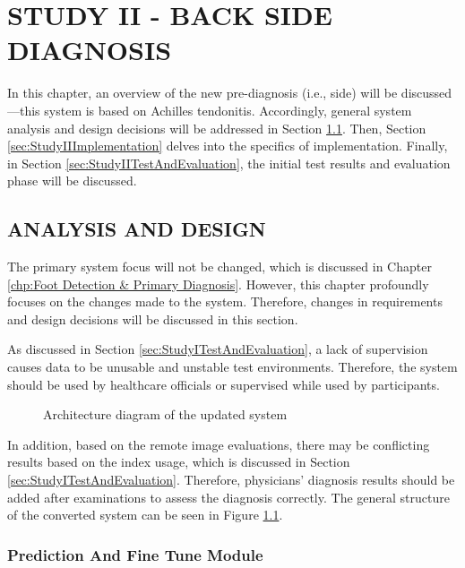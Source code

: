 \chapter{STUDY II - BACK SIDE DIAGNOSIS}\label{chp:Back Side Diagnosis}

In this chapter, an overview of the new pre-diagnosis (i.e., side) will be discussed—this system is based on Achilles tendonitis. Accordingly, general system analysis and design decisions will be addressed in Section \ref{sec:StudyIIAnalysisAndDesign}. Then, Section \ref{sec:StudyIIImplementation} delves into the specifics of implementation. Finally, in Section \ref{sec:StudyIITestAndEvaluation}, the initial test results and evaluation phase will be discussed.

\section{ANALYSIS AND DESIGN} \label{sec:StudyIIAnalysisAndDesign}

The primary system focus will not be changed, which is discussed in Chapter \ref{chp:Foot Detection & Primary Diagnosis}. However, this chapter profoundly focuses on the changes made to the system. Therefore, changes in requirements and design decisions will be discussed in this section.

As discussed in Section \ref{sec:StudyITestAndEvaluation}, a lack of supervision causes data to be unusable and unstable test environments. Therefore, the system should be used by healthcare officials or supervised while used by participants.

\begin{figure}[htbp]
\centering
{}
\caption{Architecture diagram of the updated system}
\label{fig:GeneralArchitectureDiagramPartI}
\end{figure}

In addition, based on the remote image evaluations, there may be conflicting results based on the index usage, which is discussed in Section \ref{sec:StudyITestAndEvaluation}. Therefore, physicians' diagnosis results should be added after examinations to assess the diagnosis correctly. The general structure of the converted system can be seen in Figure \ref{fig:GeneralArchitectureDiagramPartI}. 

\subsection{ Prediction And Fine Tune Module }

